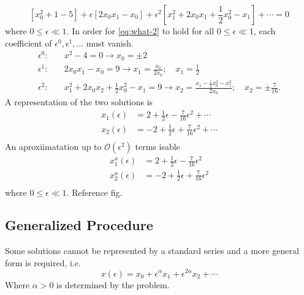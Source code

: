 \documentclass[12pt]{article}
\begin{document}
\begin{equation}
  \label{eq:what-2}
  [x_0^2+1-5]+\epsilon[2x_0x_1-x_0] + \epsilon^2[x_1^2+2x_0x_1+\frac{1}{2}x_0^2-x_1] + \cdots = 0
\end{equation}
where $0\le\epsilon\ll1$. In order for \cref{eq:what-2} to hold for all
$0\le\epsilon\ll1$, each coefficient of $\epsilon^0,\epsilon^1,\ldots$ must
vanish.
\begin{equation*}
  \begin{aligned}
    \epsilon^0:&\quad x^2-4=0\longrightarrow x_0=\pm 2 \\
    \epsilon^1:&\quad 2x_0x_1-x_0=9\longrightarrow x_1=\frac{x_0}{2x_0};\quad x_1=\frac{1}{2} \\
    \epsilon^2:&\quad x_1^2+2x_0x_2+\frac{1}{2}x_0^2-x_1=9\longrightarrow x_2=\frac{x_1-\frac{1}{2}x_0^2-x_1^2}{2x_0};\quad x_2=\pm\frac{7}{16}.
  \end{aligned}
\end{equation*}
A representation of the two solutions is
\begin{equation*}
  \begin{aligned}
    x_1(\epsilon) &= 2 + \frac{1}{2}\epsilon - \frac{7}{16}\epsilon^2 + \cdots \\
    x_2(\epsilon) &= -2 + \frac{1}{2}\epsilon + \frac{7}{16}\epsilon^2 + \cdots \\
  \end{aligned}
\end{equation*}
An aproxiimatation up to $\mathcal{O}(\epsilon^2)$ terms isable
\begin{equation*}
  \begin{aligned}
    x_1^a(\epsilon) & = 2+\frac{1}{2}\epsilon - \frac{7}{16}\epsilon^2\\
    x_2^a(\epsilon) & = -2+\frac{1}{2}\epsilon + \frac{7}{16}\epsilon^2\\
  \end{aligned}
\end{equation*}
where $0\le\epsilon\ll1$. Reference fig.

\subsection{Generalized Procedure}
Some solutions cannot be represented by a standard series and a more general
form is required, i.e.
\begin{equation*}
  x(\epsilon) = x_0+\epsilon^{\alpha}x_1 + \epsilon^{2\alpha}x_2 + \cdots
\end{equation*}
Where $\alpha>0$ is determined by the problem.
\end{document}
